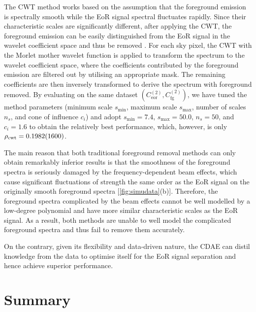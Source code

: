 \documentclass[fleqn,usenatbib]{mnras}
\newcommand{\R}[1]{\mathrm{#1}}
\newcommand{\editwip}[1]{{\leavevmode\color{magenta}#1}}
\begin{document}
\editwip{%
The CWT method works based on the assumption that the foreground emission
is spectrally smooth while the EoR signal spectral fluctuates rapidly.
Since their characteristic scales are significantly different, after
applying the CWT, the foreground emission can be easily distinguished from
the EoR signal in the wavelet coefficient space and thus be removed
\citep{gu2013}.
For each sky pixel, the CWT with the Morlet mother wavelet function is
applied to transform the spectrum to the wavelet coefficient space, where
the coefficients contributed by the foreground emission are filtered out by
utilising an appropriate mask.
The remaining coefficients are then inversely transformed to derive the
spectrum with foreground removed.
By evaluating on the same dataset
$\left( C_{\R{eor}}^{(2)}, C_{\R{fg}}^{(2)} \right)$,
we have tuned the method parameters (minimum scale $s_{\R{min}}$, maximum
scale $s_{\R{max}}$, number of scales $n_s$, and cone of influence $c_i$)
and adopt $s_{\R{min}} = 7.4$, $s_{\R{max}} = 50.0$, $n_s = 50$, and
$c_i = 1.6$ to obtain the relatively best performance, which, however, is
only $\rho_{\R{cwt}} = \num{0.1982+- 0.160}$.

The main reason that both traditional foreground removal methods can only
obtain remarkably inferior results is that the smoothness of the foreground
spectra is seriously damaged by the frequency-dependent beam effects, which
cause significant fluctuations of strength the same order as the EoR signal
on the originally smooth foreground spectra [\autoref{fig:simudata}(b)].
Therefore, the foreground spectra complicated by the beam effects cannot be
well modelled by a low-degree polynomial and have more similar
characteristic scales as the EoR signal.
As a result, both methods are unable to well model the complicated
foreground spectra and thus fail to remove them accurately.} %
On the contrary, given its flexibility and data-driven nature,
the CDAE can distil knowledge from the data to optimise itself for
the EoR signal separation and hence achieve superior performance.


\section{Summary}
\label{sec:summary}
\end{document}
